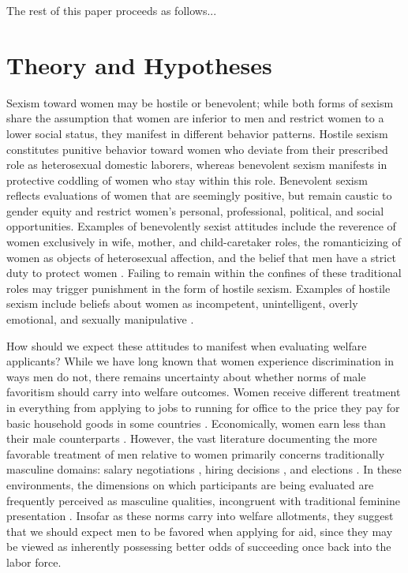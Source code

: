 \documentclass[12pt]{article}%
\begin{document}
\begin{doublespace}
The rest of this paper proceeds as follows...

\section*{Theory and Hypotheses}
Sexism toward women may be hostile or benevolent; while both forms of sexism share the assumption that women are inferior to men and restrict women to a lower social status, they manifest in different behavior patterns. Hostile sexism constitutes punitive behavior toward women who deviate from their prescribed role as heterosexual domestic laborers, whereas benevolent sexism manifests in protective coddling of women who stay within this role. Benevolent sexism reflects evaluations of women that are seemingly positive, but remain caustic to gender equity and restrict women's personal, professional, political, and social opportunities. Examples of benevolently sexist attitudes include the reverence of women exclusively in wife, mother, and child-caretaker roles, the romanticizing of women as objects of heterosexual affection, and the belief that men have a strict duty to protect women \citep{chen_gender_2020, geus_understanding_2022}. Failing to remain within the confines of these traditional roles may trigger punishment in the form of hostile sexism. Examples of hostile sexism include beliefs about women as incompetent, unintelligent, overly emotional, and sexually manipulative \citep{mcthomas_growing_2016, cassese_playing_2019}.

How should we expect these attitudes to manifest when evaluating welfare applicants? While we have long known that women experience discrimination in ways men do not, there remains uncertainty about whether norms of male favoritism should carry into welfare outcomes. Women receive different treatment in everything from applying to jobs \citep{quadlin_market} to running for office \citep{hassell_partys_2019} to the price they pay for basic household goods in some countries \citep{betz_womens_2021}. Economically, women earn less than their male counterparts \citep{mandel_up_2013}. However, the vast literature documenting the more favorable treatment of men relative to women primarily concerns traditionally masculine domains: salary negotiations \citep{castillo_gender_2013}, hiring decisions \citep{neumark_sex_1996, goldin_orchestrating_2000}, and elections \citep{clayton_how_2020}. In these environments, the dimensions on which participants are being evaluated are frequently perceived as masculine qualities, incongruent with traditional feminine presentation \citep{eagly_role_2002, koenig_are_2011}. Insofar as these norms carry into welfare allotments, they suggest that we should expect men to be favored when applying for aid, since they may be viewed as inherently possessing better odds of succeeding once back into the labor force.


\end{doublespace}
\end{document}
